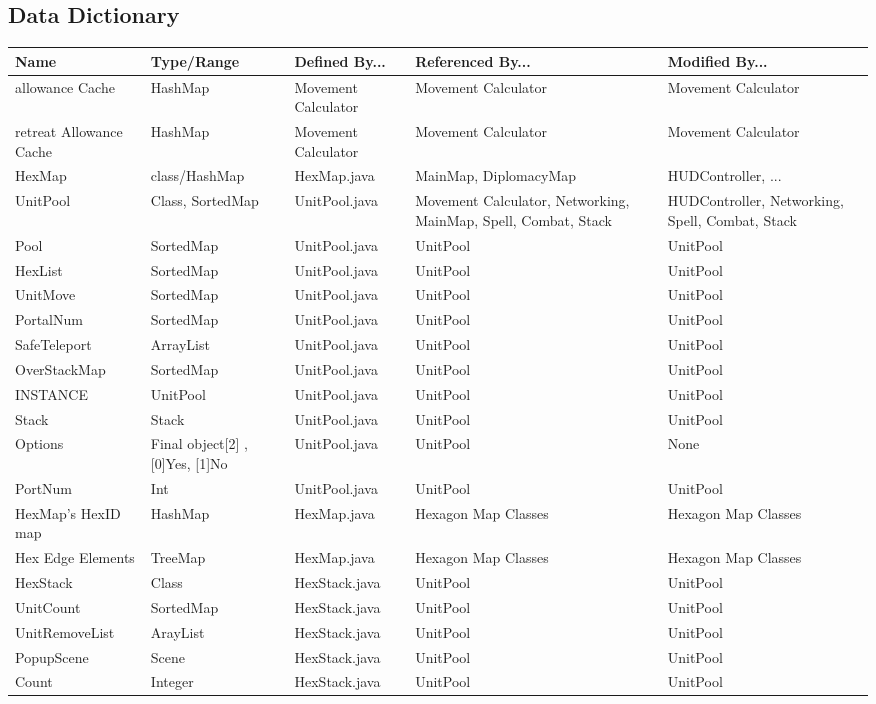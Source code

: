 \documentclass[12pt,a4paper,titlepage]{article}
\begin{document}
\subsection{Data Dictionary}
\small{
\begin{center}
\keepXColumns
\noindent\begin{tabularx}{\linewidth}{|l|X|X|X|X|}\hline
\textbf{Name} & \textbf{Type/Range} & \textbf{Defined By...} & \textbf{Referenced By...} & \textbf{Modified By...}\\
\hline
allowance Cache & HashMap & Movement Calculator & Movement Calculator & Movement Calculator\\
\hline
retreat Allowance Cache & HashMap & Movement Calculator & Movement Calculator & Movement Calculator\\
\hline
HexMap & class/HashMap & HexMap.java & MainMap, DiplomacyMap & HUDController, ...\\
\hline
UnitPool & Class, SortedMap & UnitPool.java & Movement Calculator, Networking, MainMap, Spell, Combat, Stack & HUDController, Networking, Spell, Combat, Stack\\
\hline
Pool & SortedMap & UnitPool.java & UnitPool & UnitPool\\
\hline
HexList & SortedMap & UnitPool.java & UnitPool & UnitPool\\
\hline
UnitMove & SortedMap & UnitPool.java & UnitPool & UnitPool\\
\hline
PortalNum & SortedMap & UnitPool.java & UnitPool & UnitPool\\
\hline
SafeTeleport & ArrayList & UnitPool.java & UnitPool & UnitPool\\
\hline
OverStackMap & SortedMap & UnitPool.java & UnitPool & UnitPool\\
\hline
INSTANCE & UnitPool & UnitPool.java & UnitPool & UnitPool\\
\hline
Stack & Stack & UnitPool.java & UnitPool & UnitPool\\
\hline
Options & Final object[2] ,[0]Yes, [1]No & UnitPool.java & UnitPool & None\\
\hline
PortNum & Int & UnitPool.java & UnitPool & UnitPool\\
\hline
HexMap's HexID map & HashMap & HexMap.java & Hexagon Map Classes & Hexagon Map Classes\\
\hline
Hex Edge Elements & TreeMap & HexMap.java & Hexagon Map Classes & Hexagon Map Classes\\
\hline
HexStack & Class & HexStack.java & UnitPool & UnitPool\\
\hline
UnitCount & SortedMap & HexStack.java & UnitPool & UnitPool\\
\hline
UnitRemoveList & ArayList & HexStack.java & UnitPool & UnitPool\\
\hline
PopupScene & Scene & HexStack.java & UnitPool & UnitPool\\
\hline
Count & Integer & HexStack.java & UnitPool & UnitPool\\
\hline
\end{tabularx}
\end{center}
}
	
\end{document}
